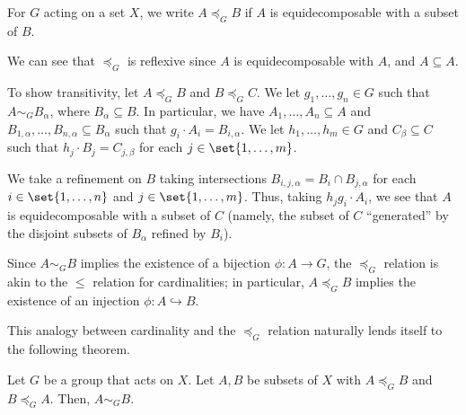 \documentclass[10pt]{mypackage}
\begin{document}
\begin{definition}
  For $G$ acting on a set $X$, we write $A\preceq_{G}B$ if $A$ is equidecomposable with a subset of $B$.
\end{definition}
\begin{remark}
  We can see that $\preceq_{G}$ is reflexive since $A$ is equidecomposable with $A$, and $A\subseteq A$.\newline

  To show transitivity, let $A\preceq_{G} B$ and $B\preceq_{G} C$. We let $g_1,\dots,g_n\in G$ such that $A\sim_{G}B_{\alpha}$, where $B_{\alpha}\subseteq B$. In particular, we have $A_1,\dots,A_n\subseteq A$ and $B_{1,\alpha},\dots,B_{n,\alpha}\subseteq B_{\alpha}$ such that $g_i\cdot A_i = B_{i,\alpha}$. We let $h_1,\dots,h_m\in G$ and $C_{\beta}\subseteq C$ such that $h_j\cdot B_j = C_{j,\beta}$ for each $j\in \set{1,\dots,m}$.\newline

  We take a refinement on $B$ taking intersections $B_{i,j,\alpha} = B_i \cap B_{j,\alpha}$ for each $i\in \set{1,\dots,n}$ and $j\in \set{1,\dots,m}$. Thus, taking $h_jg_i\cdot A_i$, we see that $A$ is equidecomposable with a subset of $C$ (namely, the subset of $C$ ``generated'' by the disjoint subsets of $B_{\alpha}$ refined by $B_i$).
\end{remark}
\begin{remark}
  Since $A\sim_{G} B$ implies the existence of a bijection $\phi: A\rightarrow G$, the $\preceq_{G}$ relation is akin to the $\leq$ relation for cardinalities; in particular, $A\preceq_{G}B$ implies the existence of an injection $\phi: A\hookrightarrow B$.\newline

  This analogy between cardinality and the $\preceq_{G}$ relation naturally lends itself to the following theorem.
\end{remark}
\begin{theorem}
  Let $G$ be a group that acts on $X$. Let $A,B$ be subsets of $X$ with $A\preceq_{G} B$ and $B\preceq_{G} A$. Then, $A\sim_{G} B$.
\end{theorem}
\end{document}
